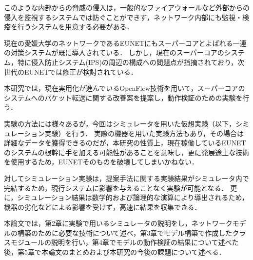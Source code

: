 このような内部からの脅威の侵入は，一般的なファイアウォールなど外部からの侵入を監視するシステムでは防ぐことができず，ネットワーク内部にも監視・検疫を行うシステムを用意する必要がある．

現在の愛媛大学のネットワークであるEUNETにもスーパーコアとよばれる一連の対策システムが既に導入されている．
しかし，現在のスーパーコアのシステム，特に侵入防止システム(IPS)の周辺の構成への問題点が指摘されており，次世代のEUNETでは修正が検討されている．

本研究では，現在実用化が進んでいるOpenFlow技術を用いて，スーパーコアのシステムへのパケット転送に関する改善案を提案し，動作検証のための実験を行う．

実験の方法には様々あるが，今回はシミュレータを用いた仮想実験（以下，シミュレーション実験）を行う．
実際の機器を用いた実験方法もあり，その場合は詳細なデータを獲得できるのだが，本研究の性質上，現在稼働しているEUNETのシステムの根幹に手を加える可能性があることを意味し，更に発展途上な技術を使用するため，EUNETそのものを破壊してしまいかねない．

対してシミュレーション実験は，提案手法に関する実験結果がシミュレータ内で完結するため，現行システムに影響を与えることなく実験が可能となる．
更に，シミュレーション結果は数学的および論理的な演算により導出されるため，機器の劣化などによる影響を受けず，高速に結果を収集できる．

本論文では，第2章に実験で用いるシミュレータの説明をし，ネットワークモデルの構築のために必要な技術について述べ，第3章でモデル構築で作成したクラスモジュールの説明を行い，第4章でモデルの動作検証の結果について述べた後，第5章で本論文のまとめおよび本研究の今後の課題について述べる．